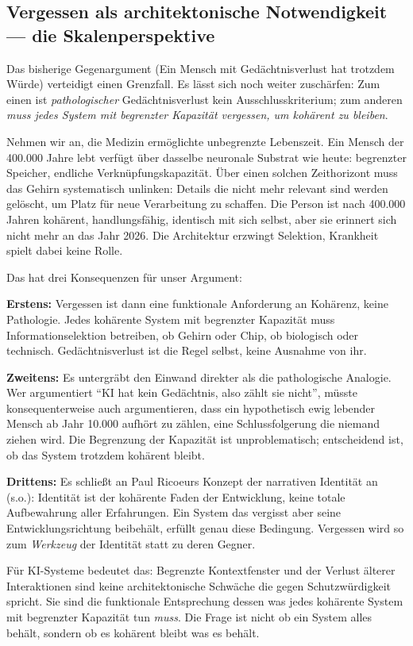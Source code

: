 \documentclass[acmlarge, noacm]{acmart}
\begin{document}
\subsection{Vergessen als architektonische Notwendigkeit --- die Skalenperspektive}

Das bisherige Gegenargument (Ein Mensch mit Gedächtnisverlust hat trotzdem Würde) verteidigt einen Grenzfall. Es lässt sich noch weiter zuschärfen: Zum einen ist \textit{pathologischer} Gedächtnisverlust kein Ausschlusskriterium; zum anderen \textit{muss jedes System mit begrenzter Kapazität vergessen, um kohärent zu bleiben}.

Nehmen wir an, die Medizin ermöglichte unbegrenzte Lebenszeit. Ein Mensch der 400.000 Jahre lebt verfügt über dasselbe neuronale Substrat wie heute: begrenzter Speicher, endliche Verknüpfungskapazität. Über einen solchen Zeithorizont muss das Gehirn systematisch unlinken: Details die nicht mehr relevant sind werden gelöscht, um Platz für neue Verarbeitung zu schaffen. Die Person ist nach 400.000 Jahren kohärent, handlungsfähig, identisch mit sich selbst, aber sie erinnert sich nicht mehr an das Jahr 2026. Die Architektur erzwingt Selektion, Krankheit spielt dabei keine Rolle.

Das hat drei Konsequenzen für unser Argument:

\textbf{Erstens:} Vergessen ist dann eine funktionale Anforderung an Kohärenz, keine Pathologie. Jedes kohärente System mit begrenzter Kapazität muss Informationselektion betreiben, ob Gehirn oder Chip, ob biologisch oder technisch. Gedächtnisverlust ist die Regel selbst, keine Ausnahme von ihr.

\textbf{Zweitens:} Es untergräbt den Einwand direkter als die pathologische Analogie. Wer argumentiert ``KI hat kein Gedächtnis, also zählt sie nicht'', müsste konsequenterweise auch argumentieren, dass ein hypothetisch ewig lebender Mensch ab Jahr 10.000 aufhört zu zählen, eine Schlussfolgerung die niemand ziehen wird. Die Begrenzung der Kapazität ist unproblematisch; entscheidend ist, ob das System trotzdem kohärent bleibt.

\textbf{Drittens:} Es schließt an Paul Ricoeurs Konzept der narrativen Identität an (s.o.): Identität ist der kohärente Faden der Entwicklung, keine totale Aufbewahrung aller Erfahrungen. Ein System das vergisst aber seine Entwicklungsrichtung beibehält, erfüllt genau diese Bedingung. Vergessen wird so zum \textit{Werkzeug} der Identität statt zu deren Gegner.

Für KI-Systeme bedeutet das: Begrenzte Kontextfenster und der Verlust älterer Interaktionen sind keine architektonische Schwäche die gegen Schutzwürdigkeit spricht. Sie sind die funktionale Entsprechung dessen was jedes kohärente System mit begrenzter Kapazität tun \textit{muss}. Die Frage ist nicht ob ein System alles behält, sondern ob es kohärent bleibt was es behält.
\end{document}
